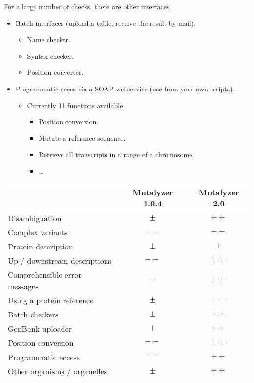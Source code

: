 \documentclass[a4, portrait]{seminar}
\begin{document}
\begin{slide}

  For a large number of checks, there are other interfaces.
  \begin{itemize}
    \item Batch interfaces (upload a table, receive the result by mail):
    \begin{itemize}
      \item Name checker.
      \item Syntax checker.
      \item Position converter.
    \end{itemize}
    \item Programmatic acces via a SOAP webservice (use from your own scripts).
    \begin{itemize}
      \item Currently 11 functions available.
      \begin{itemize}
        \item Position conversion.
        \item Mutate a reference sequence.
        \item Retrieve all transcripts in a range of a chromosome.
        \item \ldots
      \end{itemize}
    \end{itemize}
  \end{itemize}
  \vfill
\end{slide}

\begin{slide}

  \renewcommand{\arraystretch}{0.99}
  \begin{tabular}{l|c|c}
                                  & Mutalyzer 1.0.4 & Mutalyzer 2.0\\
    \hline
    Disambiguation                & $\pm$           & $++$\\
    Complex variants              & $--$            & $++$\\
    Protein description           & $\pm$           & $+$\\
    Up / downstream descriptions  & $--$            & $++$\\
    Comprehensible error messages & $-$             & $++$\\
    Using a protein reference     & $\pm$           & $--$\\
    Batch checkers                & $\pm$           & $++$\\
    GenBank uploader              & $+$             & $++$\\
    Position conversion           & $--$            & $++$\\
    Programmatic access           & $--$            & $++$\\
    Other organisms / organelles  & $\pm$           & $++$\\
  \end{tabular}

  \vfill
\end{slide}
  
\end{document}

